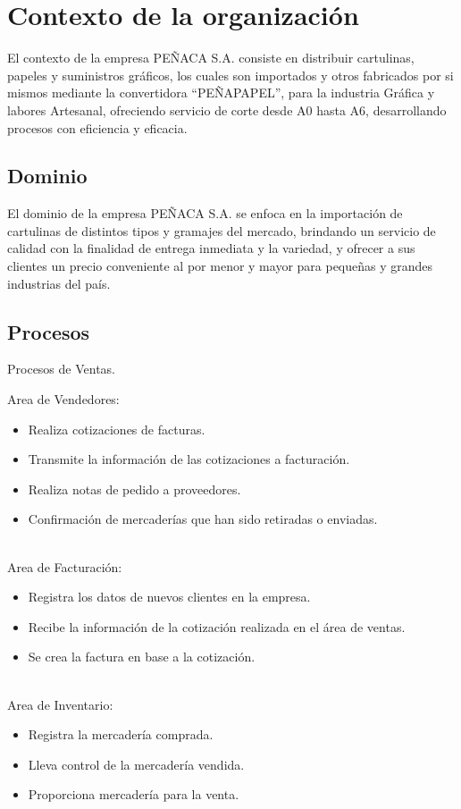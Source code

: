 \documentclass[12pt,a4paper]{article}
\begin{document}
\section{Contexto de la organización}\textbf{}
El contexto de la empresa PEÑACA S.A. consiste en distribuir cartulinas, papeles y suministros gráficos, los cuales son importados y otros fabricados por si mismos mediante la convertidora “PEÑAPAPEL”, para la industria Gráfica y labores Artesanal, ofreciendo servicio de corte desde A0 hasta A6, desarrollando procesos con eficiencia y eficacia.
 
\subsection{Dominio}
El dominio de la empresa PEÑACA S.A. se enfoca en la importación de cartulinas de distintos tipos y gramajes del mercado, brindando un servicio de calidad con la finalidad de entrega inmediata y la variedad, y ofrecer a sus clientes un precio conveniente al por menor y mayor para pequeñas y grandes industrias del país.

\subsection{Procesos}
Procesos de Ventas.

Area de Vendedores:
\begin{itemize}
\item Realiza cotizaciones de facturas.
\item Transmite la información de las cotizaciones a facturación.
\item Realiza notas de pedido a proveedores.
\item Confirmación de mercaderías que han sido retiradas o enviadas.\\\\
\end{itemize}

Area de Facturación:
\begin{itemize}
\item Registra los datos de nuevos clientes en la empresa.
\item Recibe la información de la cotización realizada en el área de ventas.
\item Se crea la factura en base a la cotización.\\\\
\end{itemize}

Area de Inventario:
\begin{itemize}
\item Registra la mercadería comprada.
\item Lleva control de la mercadería vendida.
\item Proporciona mercadería para la venta.\\\\
\end{itemize}
\end{document}
